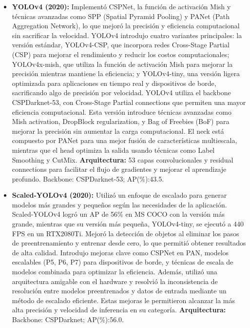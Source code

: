 \begin{itemize}
    \item \textbf{YOLOv4 (2020):} Implementó CSPNet, la función de activación Mish y técnicas avanzadas como SPP (Spatial Pyramid Pooling) y PANet (Path Aggregation Network), lo que mejoró la precisión y eficiencia computacional sin sacrificar la velocidad. YOLOv4 introdujo cuatro variantes principales: la versión estándar, YOLOv4-CSP, que incorpora redes Cross-Stage Partial (CSP) para mejorar el rendimiento y reducir los costos computacionales; YOLOv4x-mish, que utiliza la función de activación Mish para mejorar la precisión mientras mantiene la eficiencia; y YOLOv4-tiny, una versión ligera optimizada para aplicaciones en tiempo real y dispositivos de borde, sacrificando algo de precisión por velocidad. YOLOv4 utiliza el backbone CSPDarknet-53, con Cross-Stage Partial connections que permiten una mayor eficiencia computacional. Esta versión introduce técnicas avanzadas como Mish activation, DropBlock regularization, y Bag of Freebies (BoF) para mejorar la precisión sin aumentar la carga computacional. El neck está compuesto por PANet para una mejor fusión de características multiescala, mientras que el head optimiza la salida usando técnicas como Label Smoothing y CutMix.   
    \textbf{Arquitectura:} 53 capas convolucionales y residual connections para facilitar el flujo de gradientes y mejorar el aprendizaje profundo. Backbone: CSPDarknet-53; AP(\%):43.5.
   
     \item \textbf{Scaled-YOLOv4 (2020):} Utilizó un enfoque de escalado para generar modelos más grandes y pequeños según las necesidades de la aplicación. Scaled-YOLOv4 logró un AP de 56\% en MS COCO con la versión más grande, mientras que su versión más pequeña, YOLOv4-tiny, se ejecutó a 440 FPS en un RTX2080Ti. Mejoró la detección de objetos al eliminar los pasos de preentrenamiento y entrenar desde cero, lo que permitió obtener resultados de alta calidad. Introdujo mejoras clave como CSPNet en PAN, modelos escalables (P5, P6, P7) para dispositivos de borde, y técnicas de escala de modelos combinada para optimizar la eficiencia. Además, utilizó una arquitectura amigable con el hardware y resolvió la inconsistencia de resolución entre modelos preentrenados y datos de entrada mediante un método de escalado eficiente. Estas mejoras le permitieron alcanzar la más alta precisión y velocidad de inferencia en su categoría.
     \textbf{Arquitectura:} Backbone: CSPDarknet; AP(\%):56.0.
     

\end{itemize}
